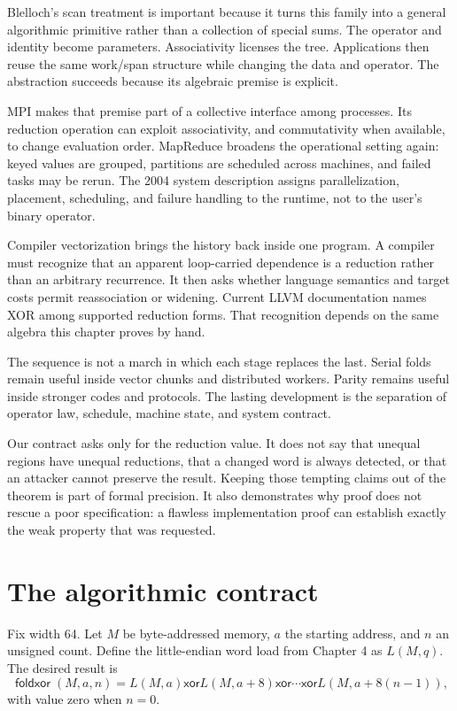 Blelloch's scan treatment is important because it turns this family into a
general algorithmic primitive rather than a collection of special sums. The
operator and identity become parameters. Associativity licenses the tree.
Applications then reuse the same work/span structure while changing the data
and operator. The abstraction succeeds because its algebraic premise is
explicit.

MPI makes that premise part of a collective interface among processes. Its
reduction operation can exploit associativity, and commutativity when
available, to change evaluation order. MapReduce broadens the operational
setting again: keyed values are grouped, partitions are scheduled across
machines, and failed tasks may be rerun. The 2004 system description assigns
parallelization, placement, scheduling, and failure handling to the runtime,
not to the user's binary operator.

Compiler vectorization brings the history back inside one program. A compiler
must recognize that an apparent loop-carried dependence is a reduction rather
than an arbitrary recurrence. It then asks whether language semantics and
target costs permit reassociation or widening. Current LLVM documentation
names XOR among supported reduction forms. That recognition depends on the
same algebra this chapter proves by hand.

The sequence is not a march in which each stage replaces the last. Serial
folds remain useful inside vector chunks and distributed workers. Parity
remains useful inside stronger codes and protocols. The lasting development is
the separation of operator law, schedule, machine state, and system contract.

Our contract asks only for the reduction value. It does not say that unequal
regions have unequal reductions, that a changed word is always detected, or
that an attacker cannot preserve the result. Keeping those tempting claims out
of the theorem is part of formal precision. It also demonstrates why proof
does not rescue a poor specification: a flawless implementation proof can
establish exactly the weak property that was requested.

\section{The algorithmic contract}

Fix width 64. Let \(M\) be byte-addressed memory, \(a\) the starting address,
and \(n\) an unsigned count. Define the little-endian word load from Chapter 4
as \(L(M,q)\). The desired result is
\[
 \mathop{\mathsf{foldxor}}(M,a,n)
 = L(M,a)\mathbin{\mathsf{xor}}L(M,a+8)
   \mathbin{\mathsf{xor}}\cdots
   \mathbin{\mathsf{xor}}L(M,a+8(n-1)),
\]
with value zero when \(n=0\).

